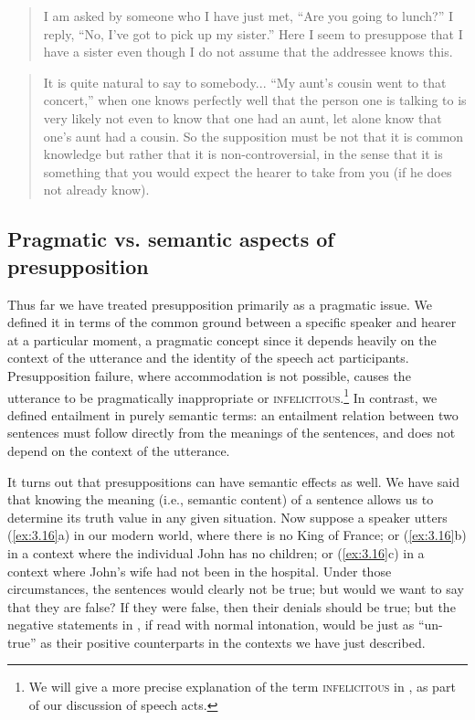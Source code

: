 \begin{quote}
I am asked by someone who I have just met, ``Are you going to lunch?'' I reply, ``No, I’ve got to pick up my sister.'' Here I seem to presuppose that I have a sister even though I do not assume that the addressee knows this. \citep[202]{Stalnaker1974} 
\end{quote}

\begin{quote}
It is quite natural to say to somebody... ``My aunt’s cousin went to that concert,'' when one knows perfectly well that the person one is talking to is very likely not even to know that one had an aunt, let alone know that one’s aunt had a cousin. So the supposition must be not that it is common knowledge but rather that it is non-controversial, in the sense that it is something that you would expect the hearer to take from you (if he does not already know). \citep[190]{Grice1981}
\end{quote}

\subsection{Pragmatic vs. semantic aspects of presupposition}\label{sec:3.4.3}\largerpage

Thus far we have treated presupposition primarily as a pragmatic issue. We defined it in terms of the common ground between a specific speaker and hearer at a particular moment, a pragmatic concept since it depends heavily on the context of the utterance and the identity of the speech act participants. Presupposition failure, where accommodation is not possible, causes the utterance to be pragmatically inappropriate or \textsc{infelicitous}.\footnote{We will give a more precise explanation of the term \textsc{infelicitous} in , as part of our discussion of speech acts.} In contrast, we defined entailment in purely semantic terms: an entailment relation between two sentences must follow directly from the meanings of the sentences, and does not depend on the context of the utterance.



It turns out that presuppositions can have semantic effects as well. We have said that knowing the meaning (i.e., semantic content) of a sentence allows us to determine its truth value in any given situation. Now suppose a speaker utters (\ref{ex:3.16}a) in our modern world, where there is no King of France; or (\ref{ex:3.16}b) in a context where the individual John has no children; or (\ref{ex:3.16}c) in a context where John’s wife had not been in the hospital. Under those circumstances, the sentences would clearly not be true; but would we want to say that they are false? If they were false, then their denials should be true; but the negative statements in , if read with normal intonation, would be just as “un-true” as their positive counterparts in the contexts we have just described.


